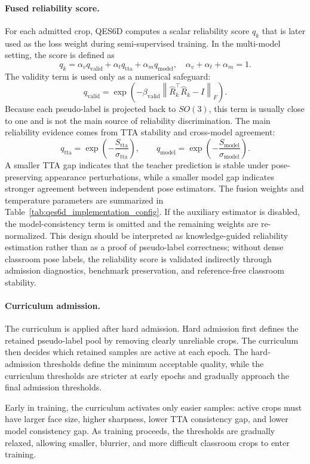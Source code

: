 \documentclass[preprint,12pt]{elsarticle}
\begin{document}
\paragraph{Fused reliability score.}
For each admitted crop, QES6D computes a scalar reliability score $q_k$ that is later used as the loss weight during semi-supervised training. In the multi-model setting, the score is defined as
\[
q_k=\alpha_v q_{\mathrm{valid}}+\alpha_t q_{\mathrm{tta}}+\alpha_m q_{\mathrm{model}},
\quad \alpha_v+\alpha_t+\alpha_m=1 .
\]
The validity term is used only as a numerical safeguard:
\[
q_{\mathrm{valid}}=\exp \left(-\beta_{\mathrm{valid}}
\left\|\hat{R}_k^\top \hat{R}_k-I\right\|_F\right).
\]
Because each pseudo-label is projected back to $SO(3)$, this term is usually close to one and is not the main source of reliability discrimination. The main reliability evidence comes from TTA stability and cross-model agreement:
\[
q_{\mathrm{tta}}=\exp \left(-\frac{S_{\mathrm{tta}}}{\sigma_{\mathrm{tta}}}\right),
\qquad
q_{\mathrm{model}}=\exp \left(-\frac{S_{\mathrm{model}}}{\sigma_{\mathrm{model}}}\right).
\]
A smaller TTA gap indicates that the teacher prediction is stable under pose-preserving appearance perturbations, while a smaller model gap indicates stronger agreement between independent pose estimators. The fusion weights and temperature parameters are summarized in Table~\ref{tab:qes6d_implementation_config}. If the auxiliary estimator is disabled, the model-consistency term is omitted and the remaining weights are re-normalized. This design should be interpreted as knowledge-guided reliability estimation rather than as a proof of pseudo-label correctness; without dense classroom pose labels, the reliability score is validated indirectly through admission diagnostics, benchmark preservation, and reference-free classroom stability.

\paragraph{Curriculum admission.}
The curriculum is applied after hard admission. Hard admission first defines the retained pseudo-label pool by removing clearly unreliable crops. The curriculum then decides which retained samples are active at each epoch. The hard-admission thresholds define the minimum acceptable quality, while the curriculum thresholds are stricter at early epochs and gradually approach the final admission thresholds.

Early in training, the curriculum activates only easier samples: active crops must have larger face size, higher sharpness, lower TTA consistency gap, and lower model consistency gap. As training proceeds, the thresholds are gradually relaxed, allowing smaller, blurrier, and more difficult classroom crops to enter training.
\end{document}
